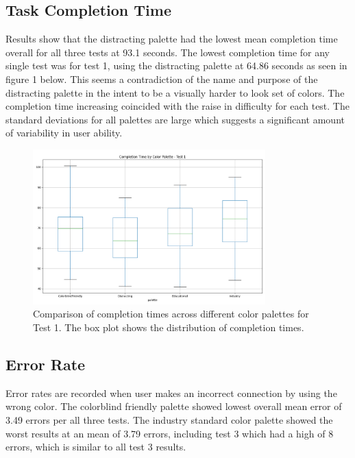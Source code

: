 \documentclass[acmlarge]{acmart}
\begin{document}
\subsection{Task Completion Time}
Results show that the distracting palette had the lowest mean completion time overall for all three tests at 93.1 seconds. The lowest completion time for any single test was for test 1, using the distracting palette at 64.86 seconds as seen in figure 1 below. This seems a contradiction of the name and purpose of the distracting palette in the intent to be a visually harder to look set of colors. The completion time increasing coincided with the raise in difficulty for each test. The standard deviations for all palettes are large which suggests a significant amount of variability in user ability.

\begin{figure} [H]
  \centering
  \includegraphics[width=0.8\textwidth]{completion_time_test1.png}
  \caption{Comparison of completion times across different color palettes for Test 1. The box plot shows the distribution of completion times.}
  \label{fig:completion-time-test1}
\end{figure}

\subsection{Error Rate}
Error rates are recorded when user makes an incorrect connection by using the wrong color. The colorblind friendly palette showed lowest overall mean error of 3.49 errors per all three tests. The industry standard color palette showed the worst results at an mean of 3.79 errors, including test 3 which had a high of 8 errors, which is similar to all test 3 results.
\end{document}
